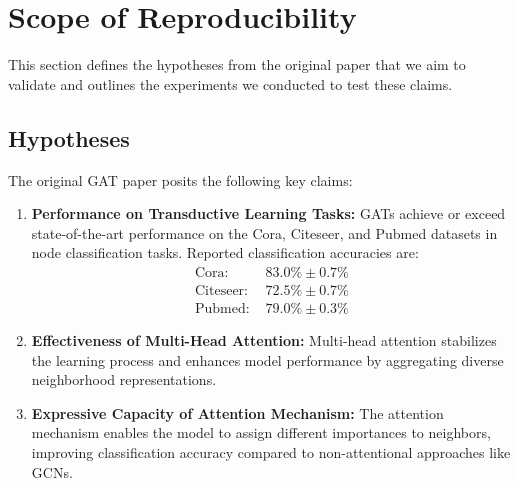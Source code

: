 \documentclass[12pt]{article}
\begin{document}
\section{Scope of Reproducibility}
This section defines the hypotheses from the original paper that we aim to validate and outlines the experiments we conducted to test these claims.

\subsection{Hypotheses}
The original GAT paper posits the following key claims:
\begin{enumerate}[leftmargin=1.5em]
    \item \textbf{Performance on Transductive Learning Tasks:}
    GATs achieve or exceed state-of-the-art performance on the Cora, Citeseer, and Pubmed datasets in node classification tasks. Reported classification accuracies are:
    \begin{align*}
        \text{Cora: } & 83.0\% \pm 0.7\% \\
        \text{Citeseer: } & 72.5\% \pm 0.7\% \\
        \text{Pubmed: } & 79.0\% \pm 0.3\%
    \end{align*}
    
    \item \textbf{Effectiveness of Multi-Head Attention:} Multi-head attention stabilizes the learning process and enhances model performance by aggregating diverse neighborhood representations.
    \item \textbf{Expressive Capacity of Attention Mechanism:} The attention mechanism enables the model to assign different importances to neighbors, improving classification accuracy compared to non-attentional approaches like GCNs.
\end{enumerate}
\end{document}
